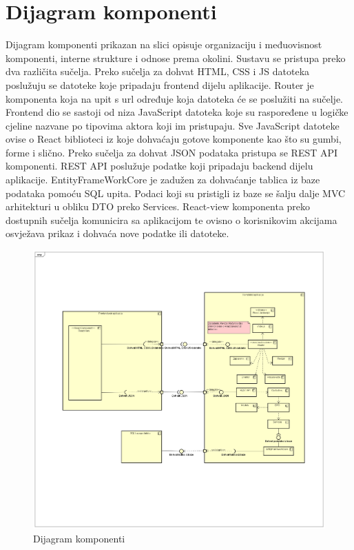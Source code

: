 			\eject
		\section{Dijagram komponenti}
		
			
			 Dijagram komponenti prikazan na slici opisuje organizaciju i međuovisnost komponenti, interne strukture i odnose prema okolini. Sustavu se pristupa preko dva različita sučelja. Preko sučelja za dohvat HTML, CSS i JS datoteka poslužuju se datoteke koje pripadaju frontend dijelu aplikacije. Router je komponenta koja na upit s url određuje koja datoteka će se poslužiti na sučelje. Frontend dio se sastoji od niza JavaScript datoteka koje su raspoređene u logičke cjeline nazvane po tipovima aktora koji im pristupaju. Sve JavaScript datoteke ovise o React biblioteci iz koje dohvaćaju gotove komponente kao što su gumbi, forme i slično. Preko sučelja za dohvat JSON podataka pristupa se REST API komponenti. REST API poslužuje podatke koji pripadaju backend dijelu aplikacije. EntityFrameWorkCore je zadužen za dohvaćanje tablica iz baze podataka pomoću SQL upita. Podaci koji su pristigli iz baze se šalju dalje MVC arhitekturi u obliku DTO preko Services. React-view komponenta preko dostupnih sučelja komunicira sa aplikacijom te ovisno o korisnikovim akcijama osvježava prikaz i dohvaća nove podatke ili datoteke.

			 \begin{figure}[H]
				\includegraphics[scale=0.3]{slike/dijagram_komponenti.png} %
				\centering
				\caption{Dijagram komponenti}
				\label{fig:promjene}
			\end{figure}
			 
		